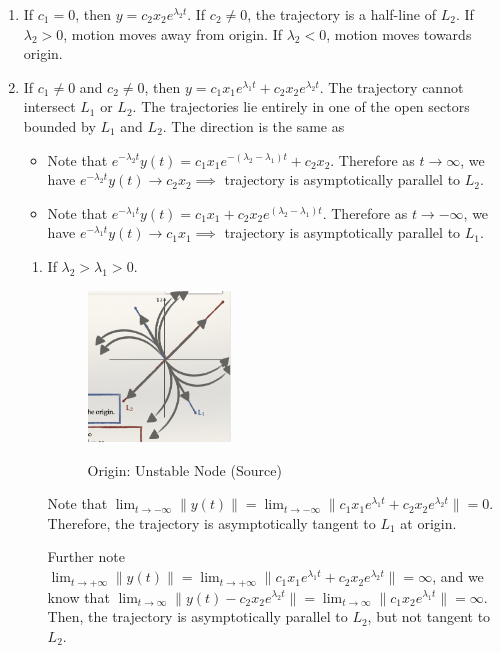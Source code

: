 \documentclass[12pt, a4paper]{article}
\def\dsst{\displaystyle}
\begin{document}
\begin{itemize}
\begin{enumerate}
\begin{enumerate}
\begin{figure}[H]
			\end{figure}
			\item If $c_1=0$, then $y=c_2x_2e^{\lambda_2t}$. If $c_2\neq0$, the trajectory is a half-line of $L_2$. If $\lambda_2>0$, motion moves away from origin. If $\lambda_2<0$, motion moves towards origin.
			\item If $c_1\neq0$ and $c_2\neq0$, then $y=c_1x_1e^{\lambda_1t}+c_2x_2e^{\lambda_2t}$. The trajectory cannot intersect $L_1$ or $L_2$. The trajectories lie entirely in one of the open sectors bounded by $L_1$ and $L_2$. The direction is the same as 
				\begin{itemize}
					\item Note that $e^{-\lambda_2t}y(t)=c_1x_1e^{-(\lambda_2-\lambda_1)t}+c_2x_2$. Therefore as $t\to\infty$, we have $e^{-\lambda_2t}y(t)\to c_2x_2\implies$ trajectory is asymptotically parallel to $L_2$.
					\item Note that $e^{-\lambda_1t}y(t)=c_1x_1+c_2x_2e^{(\lambda_2-\lambda_1)t}$. Therefore as $t\to-\infty$, we have $e^{-\lambda_1t}y(t)\to c_1x_1\implies$ trajectory is asymptotically parallel to $L_1$.
				\end{itemize}
				\begin{enumerate}
					\item If $\lambda_2>\lambda_1>0$. 
					\begin{figure}[H]
						\centering
						\includegraphics[width=0.38\textwidth]{fig/fig7}\label{fig7}
						\caption{Origin: Unstable Node (Source)}
					\end{figure}
					Note that $\dsst\lim_{t\to-\infty}\|y(t)\|=\lim_{t\to-\infty}\|c_1x_1e^{\lambda_1t}+c_2x_2e^{\lambda_2t}\|=0$. Therefore, the trajectory is asymptotically tangent to $L_1$ at origin. \par 
					Further note $\dsst\lim_{t\to+\infty}\|y(t)\|=\lim_{t\to+\infty}\|c_1x_1e^{\lambda_1t}+c_2x_2e^{\lambda_2t}\|=\infty$, and we know that $\dsst\lim_{t\to\infty}\|y(t)-c_2x_2e^{\lambda_2t}\|=\lim_{t\to\infty}\|c_1x_2e^{\lambda_1t}\|=\infty$. Then, the trajectory is asymptotically parallel to $L_2$, but not tangent to $L_2$.\par 

\end{enumerate}
\end{enumerate}
\end{enumerate}
\end{itemize}
\end{document}
